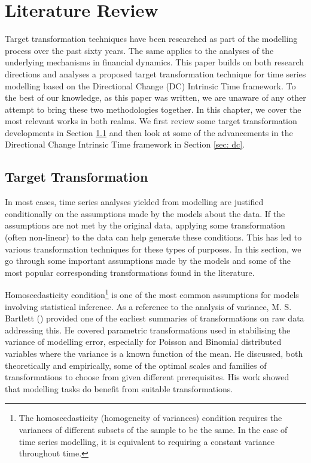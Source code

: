 \chapter{Literature Review}\label{ch: literature review}

Target transformation techniques have been researched as part of the modelling process over the past sixty years. The same applies to the analyses of the underlying mechanisms in financial dynamics. This paper builds on both research directions and analyses a proposed target transformation technique for time series modelling based on the Directional Change (DC) Intrinsic Time framework. To the best of our knowledge, as this paper was written, we are unaware of any other attempt to bring these two methodologies together. In this chapter, we cover the most relevant works in both realms. We first review some target transformation developments in Section \ref{sec: target transformation} and then look at some of the advancements in the Directional Change Intrinsic Time framework in Section \ref{sec: dc}.

\section{Target Transformation}\label{sec: target transformation}

In most cases, time series analyses yielded from modelling are justified conditionally on the assumptions made by the models about the data. If the assumptions are not met by the original data, applying some transformation (often non-linear) to the data can help generate these conditions. This has led to various transformation techniques for these types of purposes. In this section, we go through some important assumptions made by the models and some of the most popular corresponding transformations found in the literature.

Homoscedasticity condition\footnote{The homoscedasticity (homogeneity of variances) condition requires the variances of different subsets of the sample to be the same. In the case of time series modelling, it is equivalent to requiring a constant variance throughout time.} is one of the most common assumptions for models involving statistical inference. As a reference to the analysis of variance, M. S. Bartlett (\citeyear{10.2307/3001536}) provided one of the earliest summaries of transformations on raw data addressing this. He covered parametric transformations used in stabilising the variance of modelling error, especially for Poisson and Binomial distributed variables where the variance is a known function of the mean. He discussed, both theoretically and empirically, some of the optimal scales and families of transformations to choose from given different prerequisites. His work showed that modelling tasks do benefit from suitable transformations.

